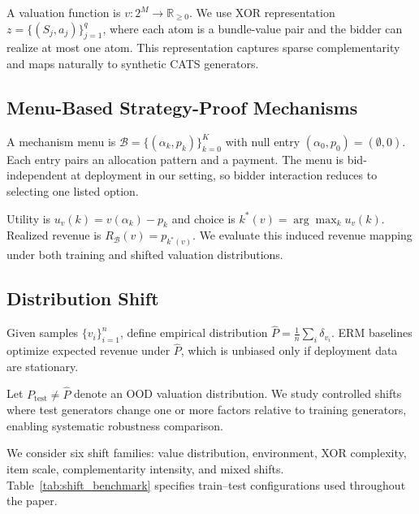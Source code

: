 \documentclass{article}
\begin{document}
A valuation function is $v:2^M\to\mathbb{R}_{\ge0}$. We use XOR representation $z=\{(S_j,a_j)\}_{j=1}^{q}$, where each atom is a bundle-value pair and the bidder can realize at most one atom. This representation captures sparse complementarity and maps naturally to synthetic CATS generators.

\subsection{Menu-Based Strategy-Proof Mechanisms}
A mechanism menu is $\mathcal B=\{(\alpha_k,p_k)\}_{k=0}^{K}$ with null entry $(\alpha_0,p_0)=(\emptyset,0)$. Each entry pairs an allocation pattern and a payment. The menu is bid-independent at deployment in our setting, so bidder interaction reduces to selecting one listed option.

Utility is $u_v(k)=v(\alpha_k)-p_k$ and choice is $k^*(v)=\arg\max_k u_v(k)$. Realized revenue is $R_{\mathcal B}(v)=p_{k^*(v)}$. We evaluate this induced revenue mapping under both training and shifted valuation distributions.

\subsection{Distribution Shift}
Given samples $\{v_i\}_{i=1}^n$, define empirical distribution $\widehat P=\frac{1}{n}\sum_i\delta_{v_i}$. ERM baselines optimize expected revenue under $\widehat P$, which is unbiased only if deployment data are stationary.

Let $P_{\mathrm{test}}\neq\widehat P$ denote an OOD valuation distribution. We study controlled shifts where test generators change one or more factors relative to training generators, enabling systematic robustness comparison.

We consider six shift families: value distribution, environment, XOR complexity, item scale, complementarity intensity, and mixed shifts. Table~\ref{tab:shift_benchmark} specifies train--test configurations used throughout the paper.
\end{document}
